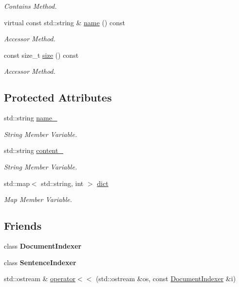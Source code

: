 \begin{DoxyCompactItemize}
\begin{DoxyCompactList}\small\item\em Contains Method. \end{DoxyCompactList}\item 
virtual const std\+::string \& \hyperlink{class_index_item_a059cbae312c51ae7d02050f8f325bf93}{name} () const
\begin{DoxyCompactList}\small\item\em Accessor Method. \end{DoxyCompactList}\item 
const size\+\_\+t \hyperlink{class_index_item_a55afe0a327fe0497bf24acf6215acd34}{size} () const
\begin{DoxyCompactList}\small\item\em Accessor Method. \end{DoxyCompactList}\end{DoxyCompactItemize}
\subsection*{Protected Attributes}
\begin{DoxyCompactItemize}
\item 
std\+::string \hyperlink{class_index_item_a803a48d6e32976f6c9c42e83b10f61c5}{name\+\_\+}
\begin{DoxyCompactList}\small\item\em String Member Variable. \end{DoxyCompactList}\item 
std\+::string \hyperlink{class_index_item_a5d2cd643f9b1749810b4f5ea479925ed}{content\+\_\+}
\begin{DoxyCompactList}\small\item\em String Member Variable. \end{DoxyCompactList}\item 
std\+::map$<$ std\+::string, int $>$ \hyperlink{class_index_item_a819728205ae50085a6bd2456ce8c556b}{dict}
\begin{DoxyCompactList}\small\item\em Map Member Variable. \end{DoxyCompactList}\end{DoxyCompactItemize}
\subsection*{Friends}
\begin{DoxyCompactItemize}
\item 
\mbox{\label{class_index_item_a449b7563be6606a689d4417c940b3b39}} 
class {\bfseries Document\+Indexer}
\item 
\mbox{\label{class_index_item_abf4e586c2270fcc2c7ef8253a33d6a8f}} 
class {\bfseries Sentence\+Indexer}
\item 
std\+::ostream \& \hyperlink{class_index_item_a09373f25959741150437b95f15ae11e2}{operator$<$$<$} (std\+::ostream \&os, const \hyperlink{class_document_indexer}{Document\+Indexer} \&i)
\end{DoxyCompactItemize}


